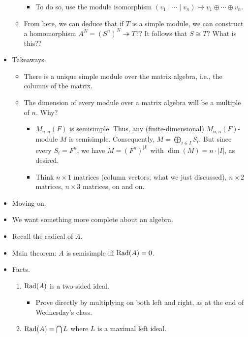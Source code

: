 \documentclass[../notes.tex]{subfiles}
\begin{document}
\begin{itemize}
\begin{itemize}
        \begin{itemize}
            \item To do so, use the module isomorphism $(v_1\mid\cdots\mid v_n)\mapsto v_1\oplus\cdots\oplus v_n$.
        \end{itemize}
        \item From here, we can deduce that if $T$ is a simple module, we can construct a homomorphism $A^N=(S^n)^N\twoheadrightarrow T$?? It follows that $S\cong T$? What is this??
    \end{itemize}
    \item Takeaways.
    \begin{itemize}
        \item There is a unique simple module over the matrix algebra, i.e., the columns of the matrix.
        \item The dimension of every module over a matrix algebra will be a multiple of $n$. Why?
        \begin{itemize}
            \item $M_{n,n}(F)$ is semisimple. Thus, any (finite-dimensional) $M_{n,n}(F)$-module $M$ is semisimple. Consequently, $M=\bigoplus_{i\in I}S_i$. But since every $S_i=F^n$, we have $M=(F^n)^{|I|}$ with $\dim(M)=n\cdot|I|$, as desired.
            \item Think $n\times 1$ matrices (column vectors; what we just discussed), $n\times 2$ matrices, $n\times 3$ matrices, on and on.
        \end{itemize}
    \end{itemize}
    \item Moving on.
    \item We want something more complete about an algebra.
    \item Recall the radical of $A$.
    \item Main theorem: $A$ is semisimple iff $\operatorname{Rad}(A)=0$.
    \item Facts.
    \begin{enumerate}
        \item $\operatorname{Rad}(A)$ is a two-sided ideal.
        \begin{itemize}
            \item Prove directly by multiplying on both left and right, as at the end of Wednesday's class.
        \end{itemize}
        \item $\operatorname{Rad}(A)=\bigcap L$ where $L$ is a maximal left ideal.
    \end{enumerate}

\end{itemize}
\end{document}

